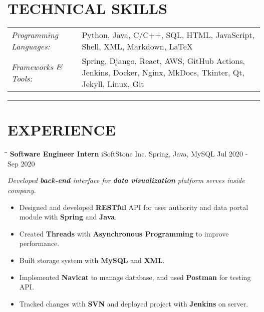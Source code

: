 \documentclass{res}
\begin{document}
\begin{resume}
\vspace{-0.2in}
\section{TECHNICAL SKILLS}  
    \vspace{+0.1in}
    \hspace{-0.12in} 
    \begin{tabular}{l p{4.6in}}
    {\sl Programming Languages:} & Python, Java, C/C++, SQL, HTML, JavaScript, 
                        Shell, XML, Markdown, LaTeX \\ 
    \rule{0in}{0.2in}
    {\sl Frameworks \& Tools:} & Spring, Django, React, AWS, GitHub Actions, Jenkins, Docker, Nginx, 
                         MkDocs, Tkinter, Qt, Jekyll, Linux, Git
    \end{tabular}   

\vspace{-5pt}
\hspace{-0.55in}
\noindent\rule[0.25\baselineskip]{19.36cm}{0.5pt}    

\vspace{-0.2in}
\section{EXPERIENCE}
    \vspace{0.00in}	
    \begin{tabbing}
    \hspace{2.6in}\= \hspace{1.5in}\= \hspace{1.6in}\= \kill %
    {\bf Software Engineer Intern} \> iSoftStone Inc. \>  
                                        Spring, Java, MySQL    \` Jul 2020 - Sep 2020\\
    \end{tabbing}\vspace{-20pt}      %
    \vspace{-0.1in}
    \textit{Developed {\bf back-end} interface for {\bf data visualization} 
                platform serves inside company.}
    \vspace{+0.05in}
    \begin{itemize} \itemsep 1.5pt %
        \item Designed and developed {\bf RESTful} API for user authority and 
                data portal module with {\bf Spring} and {\bf Java}.
        \item Created {\bf Threads} with {\bf Asynchronous Programming} to 
                improve performance.
        \item Built storage system with {\bf MySQL} and {\bf XML}.
        \item Implemented {\bf Navicat} to manage database, and used {\bf Postman} for testing API.
        \item Tracked changes with {\bf SVN} and deployed project with {\bf Jenkins} 
                on server.
    \end{itemize}


\end{resume}
\end{document}
